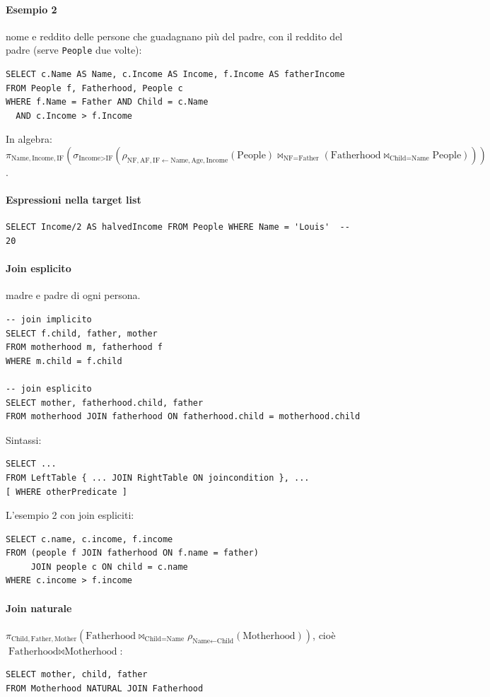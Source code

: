 \documentclass[a4paper,12pt]{article}
\begin{document}
\paragraph{Esempio 2} nome e reddito delle persone che guadagnano più del
padre, con il reddito del padre (serve \texttt{People} due volte):
\begin{verbatim}
SELECT c.Name AS Name, c.Income AS Income, f.Income AS fatherIncome
FROM People f, Fatherhood, People c
WHERE f.Name = Father AND Child = c.Name
  AND c.Income > f.Income
\end{verbatim}
In algebra:
$\pi_{\text{Name},\text{Income},\text{IF}}(\sigma_{\text{Income}>\text{IF}}(
\rho_{\text{NF},\text{AF},\text{IF} \leftarrow \text{Name},\text{Age},\text{Income}}
(\text{People}) \bowtie_{\text{NF}=\text{Father}} (\text{Fatherhood}
\bowtie_{\text{Child}=\text{Name}} \text{People})))$.

\paragraph{Espressioni nella target list}
\begin{verbatim}
SELECT Income/2 AS halvedIncome FROM People WHERE Name = 'Louis'  -- 20
\end{verbatim}

\paragraph{Join esplicito} madre e padre di ogni persona.
\begin{verbatim}
-- join implicito
SELECT f.child, father, mother
FROM motherhood m, fatherhood f
WHERE m.child = f.child

-- join esplicito
SELECT mother, fatherhood.child, father
FROM motherhood JOIN fatherhood ON fatherhood.child = motherhood.child
\end{verbatim}
Sintassi:
\begin{verbatim}
SELECT ...
FROM LeftTable { ... JOIN RightTable ON joincondition }, ...
[ WHERE otherPredicate ]
\end{verbatim}
L'esempio 2 con join espliciti:
\begin{verbatim}
SELECT c.name, c.income, f.income
FROM (people f JOIN fatherhood ON f.name = father)
     JOIN people c ON child = c.name
WHERE c.income > f.income
\end{verbatim}

\paragraph{Join naturale}
$\pi_{\text{Child},\text{Father},\text{Mother}}(\text{Fatherhood}
\bowtie_{\text{Child}=\text{Name}} \rho_{\text{Name}\leftarrow\text{Child}}
(\text{Motherhood}))$, cioè $\text{Fatherhood} \bowtie \text{Motherhood}$:
\begin{verbatim}
SELECT mother, child, father
FROM Motherhood NATURAL JOIN Fatherhood
\end{verbatim}
\end{document}
